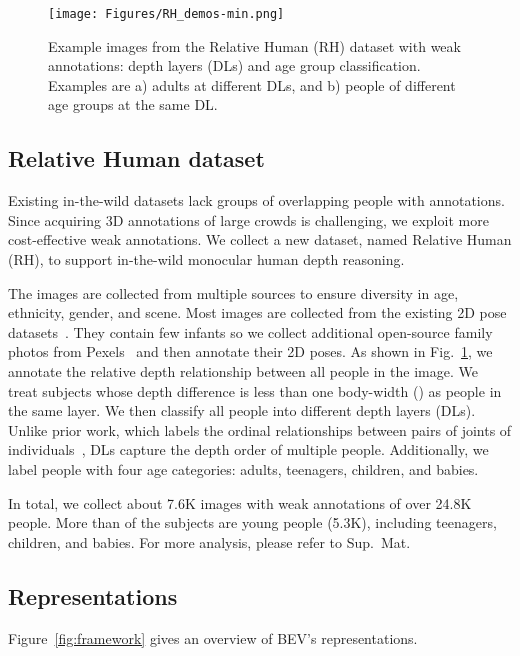 \documentclass[10pt,twocolumn,letterpaper]{article}
\begin{document}
\begin{figure}[t]
	\centerline{\texttt{[image: Figures/RH\_demos-min.png]}}
	\vspace{-5mm}
	\caption{Example images from the Relative Human (RH) dataset with weak annotations: depth layers (DLs) and age group classification. Examples are a) adults at different DLs, and b) people of different age groups at the same DL.}
	\label{fig:RH_dmeos}\vspace{-3mm}
\end{figure}

\subsection{Relative Human dataset}
\label{sec:relative_human}
Existing in-the-wild datasets lack groups of overlapping people with annotations.
Since acquiring 3D annotations of large crowds is challenging, we exploit more cost-effective weak annotations. 
We collect a new dataset, named Relative Human (RH), to support in-the-wild monocular human depth reasoning.


The images are collected from multiple sources to ensure diversity in age, ethnicity, gender, and scene.
Most images are collected from the existing 2D pose datasets~\cite{coco,crowdpose,zhang2019pose2seg}. 
They contain few infants so we collect additional open-source family photos from Pexels~\cite{pexels} and then annotate their 2D poses.
As shown in Fig.~\ref{fig:RH_dmeos}, we annotate the relative depth relationship between all people in the image.
We treat subjects whose depth difference is less than one body-width () as people in the same layer.
We then classify all people into different depth layers (DLs).
Unlike prior work, which labels the ordinal relationships between pairs of joints of individuals~\cite{chen2016single}, DLs capture the depth order of multiple people.
Additionally, we label people with four age categories: adults, teenagers, children, and babies.

In total, we collect about 7.6K images with weak annotations of over 24.8K people.
More than  of the subjects are young people (5.3K), including teenagers, children, and babies.
For more analysis, please refer to Sup.~Mat.

\subsection{Representations}\label{sec:representations}
\noindent Figure~\ref{fig:framework} gives an overview of BEV's representations.
\end{document}
